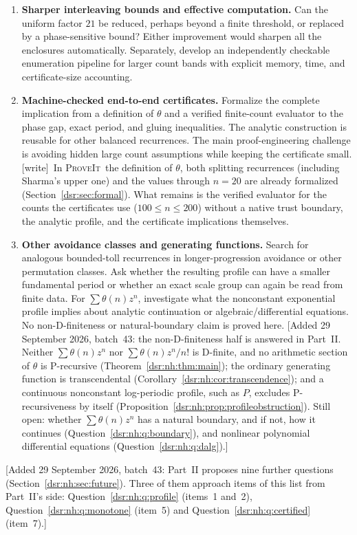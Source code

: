 \documentclass[11pt,a4paper]{article}
\numberwithin{equation}{section}
\theoremstyle{definition}
\theoremstyle{remark}
\newcommand{\repo}{\textsc{ProveIt}}
\newcommand{\wtag}{\textup{[write]}}
\theoremstyle{definition}
\theoremstyle{plain}
\begin{document}
\begin{enumerate}[label=\textbf{\arabic*.},leftmargin=*]
\item \textbf{Sharper interleaving bounds and effective computation.}
Can the uniform factor $21$ be reduced, perhaps beyond a finite threshold,
or replaced by a phase-sensitive bound? Either improvement would sharpen
all the enclosures automatically. Separately, develop an independently
checkable enumeration pipeline for larger count bands with explicit memory,
time, and certificate-size accounting.

\item \textbf{Machine-checked end-to-end certificates.}
Formalize the complete implication from a definition of $\theta$ and a
verified finite-count evaluator to the phase gap, exact period, and gluing
inequalities. The analytic construction is reusable for other balanced
recurrences. The main proof-engineering challenge is avoiding hidden large
count assumptions while keeping the certificate small.
\wtag\ In \repo\ the definition of $\theta$, both splitting recurrences
(including Sharma's upper one) and the values through $n=20$ are already
formalized (Section~\ref{dsr:sec:formal}). What remains is the verified
evaluator for the counts the certificates use ($100\le n\le200$) without a
native trust boundary, the analytic profile, and the certificate
implications themselves.

\item \textbf{Other avoidance classes and generating functions.}
Search for analogous bounded-toll recurrences in longer-progression
avoidance or other permutation classes. Ask whether the resulting profile
can have a smaller fundamental period or whether an exact scale group can
again be read from finite data. For $\sum\theta(n)z^n$, investigate what the
nonconstant exponential profile implies about analytic continuation or
algebraic/differential equations. No non-D-finiteness or natural-boundary
claim is proved here.
[Added 29 September 2026, batch~43: the non-D-finiteness half is answered
in Part~II. Neither $\sum\theta(n)z^n$ nor $\sum\theta(n)z^n/n!$ is
D-finite, and no arithmetic section of $\theta$ is P-recursive
(Theorem~\ref{dsr:nh:thm:main}); the ordinary generating function is
transcendental (Corollary~\ref{dsr:nh:cor:transcendence}); and a
continuous nonconstant log-periodic profile, such as $P$, excludes
P-recursiveness by itself (Proposition~\ref{dsr:nh:prop:profileobstruction}).
Still open: whether $\sum\theta(n)z^n$ has a natural boundary, and if
not, how it continues (Question~\ref{dsr:nh:q:boundary}), and nonlinear polynomial differential
equations (Question~\ref{dsr:nh:q:dalg}).]
\end{enumerate}
[Added 29 September 2026, batch~43: Part~II proposes nine further
questions (Section~\ref{dsr:nh:sec:future}). Three of them approach items
of this list from Part~II's side: Question~\ref{dsr:nh:q:profile} (items~1
and~2), Question~\ref{dsr:nh:q:monotone} (item~5) and
Question~\ref{dsr:nh:q:certified} (item~7).]
\end{document}
